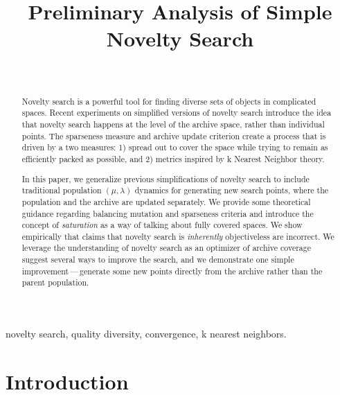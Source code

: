 \documentclass[twoside]{article}
\begin{document}
\title{\bf Preliminary Analysis of Simple Novelty Search}  

\author{ \hfill {}\\ 
}

\maketitle

\begin{abstract}
Novelty search is a powerful tool for finding diverse sets of objects in complicated spaces.  Recent experiments on simplified versions of novelty search introduce the idea that novelty search happens at the level of the archive space, rather than individual points.  The sparseness measure and archive update criterion create a process that is driven by a two measures: 1) spread out to cover the space while trying to remain as efficiently packed as possible, and 2) metrics inspired by k Nearest Neighbor theory.

In this paper, we generalize previous simplifications of novelty search to include traditional population  $(\mu, \lambda)$ dynamics for generating new search points, where the population and the archive are updated separately.  We provide some theoretical guidance regarding balancing mutation and sparseness criteria and introduce the concept of \emph{saturation} as a way of talking about fully covered spaces.  We show empirically that claims that novelty search is \emph{inherently} objectiveless are incorrect.  We leverage the understanding of novelty search as an optimizer of archive coverage suggest several ways to improve the search, and we demonstrate one simple improvement\,---\,generate some new points directly from the archive rather than the parent population.
\end{abstract}

\begin{keywords}
novelty search, 
quality diversity,
convergence,
k nearest neighbors.
\end{keywords}

\section{Introduction}
\label{sec:introduction}
\end{document}
